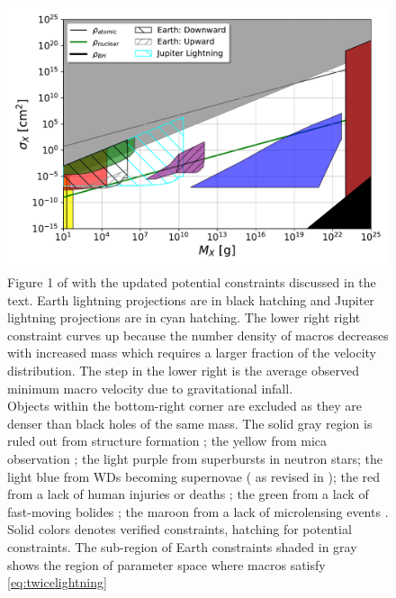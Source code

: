 \documentclass[%
 reprint,
 amsmath,amssymb,
 aps,
]{revtex4-2}
\begin{document}


\begin{figure}
    \includegraphics[width=\textwidth]{lightningconstraints.pdf}
    \caption{
        Figure 1 of \citep{Sidhu2020reconsider} with the updated potential constraints discussed in the text. Earth lightning projections are in black hatching and Jupiter lightning projections are in cyan hatching. The lower right right constraint curves up because the number density of macros decreases with increased mass which requires a larger fraction of the velocity distribution. The step in the lower right is the average observed minimum macro velocity due to gravitational infall.
        \\
        Objects within the bottom-right corner are excluded as they are denser than black holes of the same mass. The {\color{gray} solid gray} region is ruled out from structure formation \citep{Wilkinson2014angular}; the {\color{yellow} yellow} from mica observation \citep{DeRujula1984axn, Price1988ge};  the light {\color{blue} purple} from superbursts in neutron stars; the {\color{cyan} light blue} from WDs becoming supernovae (\citet{Graham2018} as revised in \citet{Sidhu2020reconsider});  the {\color{red} red} from a lack of human injuries or deaths \citep{Sidhu2019death}; the {\color{green} green} from a lack of fast-moving bolides \citep{Sidhu2019bolide}; the {\color{purple} maroon} from a lack of microlensing events \citep{Niikura2019, Alcock2001, Tisserand2007, Carr2010, Griest2013}. Solid colors denotes verified constraints, hatching for potential constraints.
        The sub-region of Earth constraints shaded in {\color{gray} gray} shows the region of parameter space where macros satisfy \eqref{eq:twicelightning}
    }\label{fig:constraints}
\end{figure}
\end{document}
